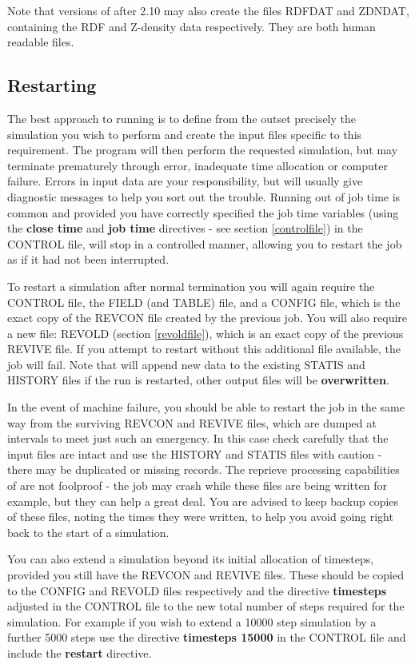 Note that versions of \D{} after 2.10 may also create the files RDFDAT
and ZDNDAT, containing the RDF and Z-density data respectively. They
are both human readable files.

\subsection{Restarting \D{}}

The best approach to running \D{} is to define from the outset
precisely the simulation you wish to perform and create the input
files specific to this requirement. The program will then perform the
requested simulation, but may terminate prematurely through error,
inadequate time allocation or computer failure. Errors in input data
are your responsibility, but \D{} will usually give diagnostic messages
to help you sort out the trouble. Running out of job time is common
and provided you have correctly specified the job time variables
(using the {\bf close time} and {\bf job time} directives - see
section \ref{controlfile}) in the CONTROL file, \D{} will stop in a
controlled manner, allowing you to restart the job as if it had not
been interrupted.

To restart a simulation after normal termination you will again
require the CONTROL file, the FIELD (and TABLE) file, and a CONFIG
file, which is the exact copy of the REVCON file created by the
previous job.  You will also require a new file: REVOLD (section
\ref{revoldfile}), which is an exact copy of the previous REVIVE file.
If you attempt to restart \D{} without this additional file available,
the job will fail.  Note that \D{} will append new data to the existing
STATIS and HISTORY files if the run is restarted, other output files
will be {\bf overwritten}.

In the event of machine failure, you should be able to restart the job
in the same way from the surviving REVCON and REVIVE files, which are
dumped at intervals to meet just such an emergency. In this case check
carefully that the input files are intact and use the HISTORY and
STATIS files with caution - there may be duplicated or missing
records. The reprieve processing capabilities of \D{} are not foolproof
- the job may crash while these files are being written for example,
but they can help a great deal. You are advised to keep
backup copies of these files, noting the times they were written, to
help you avoid going right back to the start of a simulation.

You can also extend a simulation beyond its initial allocation of
timesteps, provided you still have the REVCON and REVIVE files. These
should be copied to the CONFIG and REVOLD files respectively and the
directive {\bf timesteps} adjusted in the CONTROL file to the new
total number of steps required for the simulation. For example if you
wish to extend a 10000 step simulation by a further 5000 steps use the
directive {\bf timesteps 15000} in the CONTROL file and include the
{\bf restart} directive. 

